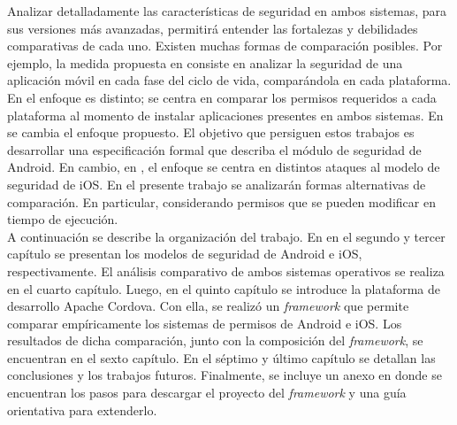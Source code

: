 Analizar detalladamente las características de seguridad en ambos sistemas, para sus versiones más avanzadas, permitirá entender las fortalezas y debilidades comparativas de cada uno. Existen muchas formas de comparación posibles. Por ejemplo, la medida propuesta en \cite{YA2014} consiste en analizar la seguridad de una aplicación móvil en cada fase del ciclo de vida, comparándola en cada plataforma. En \cite{HYGZD2014} el enfoque es distinto; se centra en comparar los permisos requeridos a cada plataforma al momento de instalar aplicaciones presentes en ambos sistemas. En \cite{Gor16, BCLR15, Rom14} se cambia el enfoque propuesto. El objetivo que persiguen estos trabajos es desarrollar una especificación formal que describa el módulo de seguridad de Android. En cambio, en \cite{TZSH13}, el enfoque se centra en distintos ataques al modelo de seguridad de iOS. En el presente trabajo se analizarán formas alternativas de comparación. En particular, considerando permisos que se pueden modificar en tiempo de ejecución.\\

A continuación se describe la organización del trabajo. En en el segundo y tercer capítulo se presentan los modelos de seguridad de Android e iOS, respectivamente. El análisis comparativo de ambos sistemas operativos se realiza en el cuarto capítulo. Luego, en el quinto capítulo se introduce la plataforma de desarrollo Apache Cordova. Con ella, se realizó un \emph{framework} que permite comparar empíricamente los sistemas de permisos de Android e iOS. Los resultados de dicha comparación, junto con la composición del \emph{framework}, se encuentran en el sexto capítulo. En el séptimo y último capítulo se detallan las conclusiones y los trabajos futuros. Finalmente, se incluye un anexo en donde se encuentran los pasos para descargar el proyecto del \emph{framework} y una guía orientativa para extenderlo.